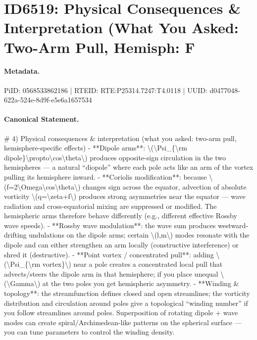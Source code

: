 \section*{ID6519: Physical Consequences \& Interpretation (What You Asked: Two-Arm Pull, Hemisph: F}
\paragraph{Metadata.}
PiID: 0568533862186 | RTEID: RTE:P25314.7247:T4.0118 | UUID: d0477048-622a-524e-8d9f-e5e6a1657534

\paragraph{Canonical Statement.}
\# 4) Physical consequences \& interpretation (what you asked: two-arm pull, hemisphere-specific effects) - **Dipole arms**: \textbackslash{}(\textbackslash{}Psi\_\{\textbackslash{}rm dipole\}\textbackslash{}propto\textbackslash{}cos\textbackslash{}theta\textbackslash{}) produces opposite-sign circulation in the two hemispheres — a natural “diopole” where each pole acts like an arm of the vortex pulling its hemisphere inward. - **Coriolis modification**: because \textbackslash{}(f=2\textbackslash{}Omega\textbackslash{}cos\textbackslash{}theta\textbackslash{}) changes sign across the equator, advection of absolute vorticity \textbackslash{}(q=\textbackslash{}zeta+f\textbackslash{}) produces strong asymmetries near the equator — wave radiation and cross-equatorial mixing are suppressed or modified. The hemispheric arms therefore behave differently (e.g., different effective Rossby wave speeds). - **Rossby wave modulation**: the wave sum produces westward-drifting undulations on the dipole arms; certain \textbackslash{}(l,m\textbackslash{}) modes resonate with the dipole and can either strengthen an arm locally (constructive interference) or shred it (destructive). - **Point vortex / concentrated pull**: adding \textbackslash{}(\textbackslash{}Psi\_\{\textbackslash{}rm vortex\}\textbackslash{}) near a pole creates a concentrated local pull that advects/steers the dipole arm in that hemisphere; if you place unequal \textbackslash{}(\textbackslash{}Gamma\textbackslash{}) at the two poles you get hemispheric asymmetry. - **Winding \& topology**: the streamfunction defines closed and open streamlines; the vorticity distribution and circulation around poles give a topological “winding number” if you follow streamlines around poles. Superposition of rotating dipole + wave modes can create spiral/Archimedean-like patterns on the spherical surface — you can tune parameters to control the winding density.

